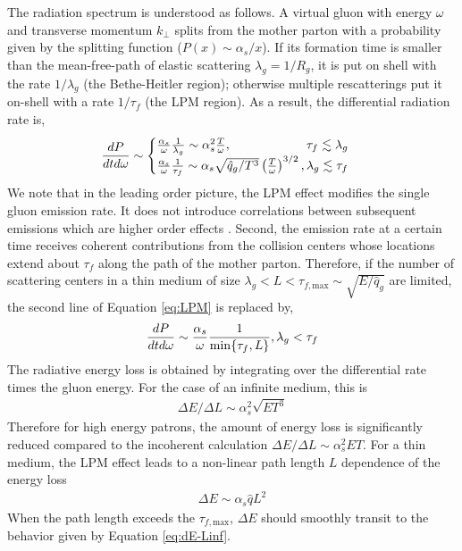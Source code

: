 \documentclass[aps, prc, reprint, amsmath, groupedaddress, nofootinbib]{revtex4-1}
\begin{document}
The radiation spectrum is understood as follows. 
A virtual gluon with energy $\omega$ and transverse momentum $k_\perp$ splits from the mother parton with a probability given by the splitting function ($P(x) \sim \alpha_s/x$).
If its formation time is smaller than the mean-free-path of elastic scattering $\lambda_g = 1/R_g$, it is put on shell with the rate $1/\lambda_g$ (the Bethe-Heitler region); otherwise multiple rescatterings put it on-shell with a rate $1/\tau_f$ (the LPM region).
As a result, the differential radiation rate is,
\begin{eqnarray}\label{eq:LPM}
\frac{dP}{dt d\omega} \sim \begin{cases}
 \frac{\alpha_s}{\omega} \frac{1}{\lambda_g} \sim \alpha_s^2  \frac{T}{\omega}, \hfill \tau_f \lesssim \lambda_g\\
 \frac{\alpha_s}{\omega} \frac{1}{\tau_f}\sim \alpha_s \sqrt{\hat{q}_g/T^3} \left(\frac{T}{\omega}\right)^{3/2}, \hfill \lambda_g \lesssim \tau_f
\end{cases}
\end{eqnarray}
We note that in the leading order picture, the LPM effect modifies the single gluon emission rate. 
It does not introduce correlations between subsequent emissions which are higher order effects \cite{Arnold:2016jnq}.
Second, the emission rate at a certain time receives coherent contributions from the collision centers whose locations extend about $\tau_f$ along the path of the mother parton.
Therefore, if the number of scattering centers in a thin medium of size $\lambda_g < L< \tau_{f,\textrm{max}} \sim \sqrt{E/\hat{q}_g}$ are limited, the second line of Equation \ref{eq:LPM} is replaced by,
\begin{eqnarray}
\frac{dP}{dt d\omega} \sim 
 \frac{\alpha_s}{\omega} \frac{1}{\min\{\tau_f,L\}}, \hfill \lambda_g < \tau_f
\end{eqnarray}
The radiative energy loss is obtained by integrating over the differential rate times the gluon energy. 
For the case of an infinite medium, this is
\begin{eqnarray}\label{eq:dE-Linf}
\Delta E/\Delta L \sim \alpha_s^2 \sqrt{ET^3}
\end{eqnarray}
Therefore for high energy patrons, the amount of energy loss is significantly reduced compared to the incoherent calculation $\Delta E/\Delta L \sim \alpha_s^2 E T$.
For a thin medium, the LPM effect leads to a non-linear path length $L$ dependence of the energy loss
\begin{eqnarray}\label{eq:dE-Lfinite}
\Delta E \sim \alpha_s \hat{q} L^2
\end{eqnarray}
When the path length exceeds the $\tau_{f,\textrm{max}}$, $\Delta E$ should smoothly transit to the behavior given by Equation \ref{eq:dE-Linf}.
\end{document}
